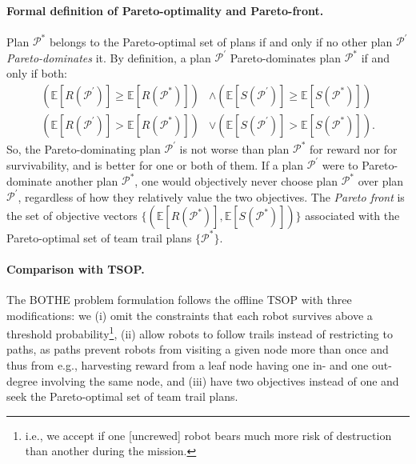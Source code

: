 \documentclass[11pt, oneside]{article}
\begin{document}
\paragraph{Formal definition of Pareto-optimality and Pareto-front.}
Plan $\mathcal{P}^*$ belongs to the Pareto-optimal set of plans if and only if no other plan $\mathcal{P}^\prime$ \emph{Pareto-dominates} it. By definition, a plan $\mathcal{P}^\prime$ Pareto-dominates plan $\mathcal{P}^*$ if and only if both:
\begin{align}
	\left (\mathbb{E}[R(\mathcal{P}^\prime)] \geq \mathbb{E}[R(\mathcal{P}^*)]  \right) & \wedge \left( \mathbb{E}[S(\mathcal{P}^\prime)] \geq \mathbb{E}[S(\mathcal{P}^*)] \right) \\
	\left( \mathbb{E}[R(\mathcal{P}^\prime)] > \mathbb{E}[R(\mathcal{P}^*)] \right) & \vee \left( \mathbb{E}[S(\mathcal{P}^\prime)] > \mathbb{E}[S(\mathcal{P}^*)] \right).
\end{align}
So, the Pareto-dominating plan $\mathcal{P}^\prime$ is not worse than plan $\mathcal{P}^*$ for reward nor for survivability, and is better for one or both of them.
If a plan $\mathcal{P}^\prime$ were to Pareto-dominate another plan $\mathcal{P}^*$, one would objectively never choose plan $\mathcal{P}^*$ over plan $\mathcal{P}^\prime$, regardless of how they relatively value the two objectives. The \emph{Pareto front} is the set of objective vectors $\{(\mathbb{E}[R(\mathcal{P}^*)], \mathbb{E}[S(\mathcal{P}^*)])\}$ associated with the Pareto-optimal set of team trail plans $\{\mathcal{P}^*\}$.  

\paragraph{Comparison with TSOP.}
The BOTHE problem formulation follows the offline TSOP \cite{jorgensen2018team} with three modifications: we 
(i) omit the constraints that each robot survives above a threshold probability\footnote{i.e., we accept if one [uncrewed] robot bears much more risk of destruction than another during the mission.},
(ii) allow robots to follow trails instead of restricting to paths, as paths prevent robots from visiting a given node more than once and thus from e.g., harvesting reward from a leaf node having one in- and one out-degree involving the same node, 
and
(iii) have two objectives instead of one and seek the Pareto-optimal set of team trail plans.
\end{document}
